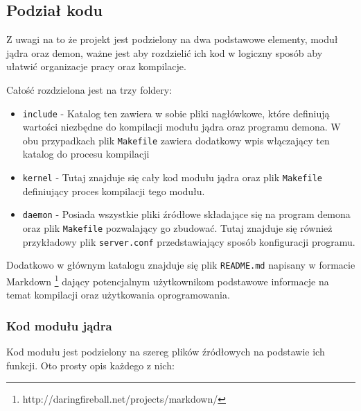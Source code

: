 \documentclass[10pt]{article}
\begin{document}
\subsection{Podział kodu}

Z uwagi na to że projekt jest podzielony na dwa podstawowe elementy, moduł jądra oraz demon, ważne jest aby rozdzielić ich kod w logiczny sposób aby ułatwić organizacje pracy oraz kompilacje.

Całość rozdzielona jest na trzy foldery:

\begin{itemize}
\itemsep1pt\parskip0pt
\item
  \texttt{include} - Katalog ten zawiera w sobie pliki nagłówkowe, które definiują wartości niezbędne do kompilacji modułu jądra oraz programu demona. W obu przypadkach plik \texttt{Makefile} zawiera dodatkowy wpis włączający ten katalog do procesu kompilacji
\item
  \texttt{kernel} - Tutaj znajduje się cały kod modułu jądra oraz plik
  \texttt{Makefile} definiujący proces kompilacji tego modułu.
\item
  \texttt{daemon} - Posiada wszystkie pliki źródłowe składające się na program demona oraz plik \texttt{Makefile} pozwalający go zbudować.  Tutaj znajduje się również przykładowy plik \texttt{server.conf} przedstawiający sposób konfiguracji programu.
\end{itemize}

Dodatkowo w głównym katalogu znajduje się plik \texttt{README.md} napisany w formacie Markdown \footnote{http://daringfireball.net/projects/markdown/} dający potencjalnym użytkownikom podstawowe informacje na temat kompilacji oraz użytkowania oprogramowania.

\subsubsection{Kod modułu jądra}

Kod modułu jest podzielony na szereg plików źródłowych na podstawie ich funkcji. Oto prosty opis każdego z nich:
\end{document}
